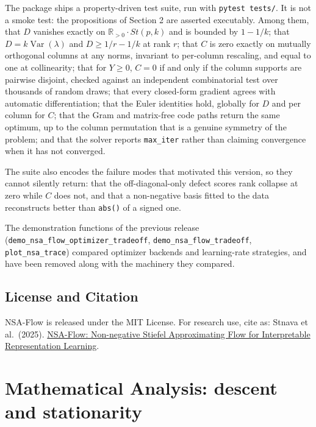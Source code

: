 \documentclass[
]{article}
\begin{document}
The package ships a property-driven test suite, run with \texttt{pytest\ tests/}. It is
not a smoke test: the propositions of Section 2 are asserted executably. Among
them, that \(D\) vanishes exactly on \(\mathbb{R}_{>0}\cdot St(p,k)\) and is
bounded by \(1 - 1/k\); that \(D = k\operatorname{Var}(\lambda)\) and
\(D \ge 1/r - 1/k\) at rank \(r\); that \(C\) is zero exactly on mutually
orthogonal columns at any norms, invariant to per-column rescaling, and equal to
one at collinearity; that for \(Y \ge 0\), \(C = 0\) if and only if the column
supports are pairwise disjoint, checked against an independent combinatorial test
over thousands of random draws; that every closed-form gradient agrees with
automatic differentiation; that the Euler identities hold, globally for \(D\) and
per column for \(C\); that the Gram and matrix-free code paths return the same
optimum, up to the column permutation that is a genuine symmetry of the problem;
and that the solver reports \texttt{max\_iter} rather than claiming convergence when it
has not converged.

The suite also encodes the failure modes that motivated this version, so they
cannot silently return: that the off-diagonal-only defect scores rank collapse at
zero while \(C\) does not, and that a non-negative basis fitted to the data
reconstructs better than \texttt{abs()} of a signed one.

The demonstration functions of the previous release
(\texttt{demo\_nsa\_flow\_optimizer\_tradeoff}, \texttt{demo\_nsa\_flow\_tradeoff},
\texttt{plot\_nsa\_trace}) compared optimizer backends and learning-rate strategies, and
have been removed along with the machinery they compared.

\subsection{License and Citation}\label{license-and-citation}

NSA-Flow is released under the MIT License. For research use, cite as: Stnava et al.~(2025). \href{https://github.com/stnava/nsa_flow}{NSA-Flow: Non-negative Stiefel Approximating Flow for Interpretable Representation Learning}.

\section{Mathematical Analysis: descent and stationarity}\label{mathematical-analysis-descent-and-stationarity}
\end{document}
